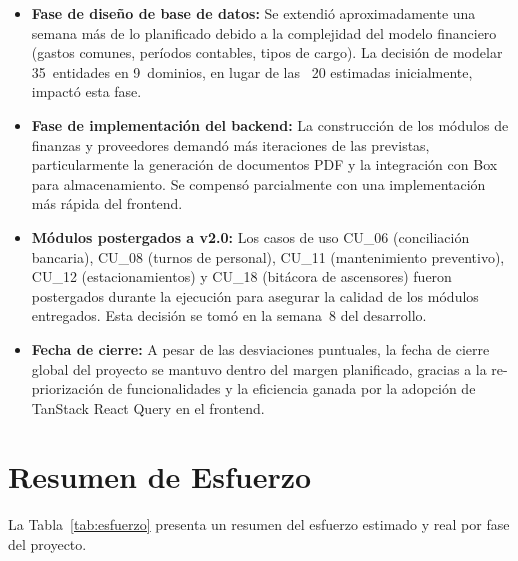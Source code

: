 \begin{itemize}
    \item \textbf{Fase de diseño de base de datos:} Se extendió aproximadamente una semana más de lo planificado debido a la complejidad del modelo financiero (gastos comunes, períodos contables, tipos de cargo). La decisión de modelar 35~entidades en 9~dominios, en lugar de las ~20 estimadas inicialmente, impactó esta fase.

    \item \textbf{Fase de implementación del backend:} La construcción de los módulos de finanzas y proveedores demandó más iteraciones de las previstas, particularmente la generación de documentos PDF y la integración con Box para almacenamiento. Se compensó parcialmente con una implementación más rápida del frontend.

    \item \textbf{Módulos postergados a v2.0:} Los casos de uso CU\_06 (conciliación bancaria), CU\_08 (turnos de personal), CU\_11 (mantenimiento preventivo), CU\_12 (estacionamientos) y CU\_18 (bitácora de ascensores) fueron postergados durante la ejecución para asegurar la calidad de los módulos entregados. Esta decisión se tomó en la semana~8 del desarrollo.

    \item \textbf{Fecha de cierre:} A pesar de las desviaciones puntuales, la fecha de cierre global del proyecto se mantuvo dentro del margen planificado, gracias a la re-priorización de funcionalidades y la eficiencia ganada por la adopción de TanStack React Query en el frontend.
\end{itemize}

\section{Resumen de Esfuerzo}

La Tabla~\ref{tab:esfuerzo} presenta un resumen del esfuerzo estimado y real por fase del proyecto.


